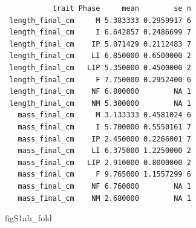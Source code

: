 \documentclass[
  landscape]{article}
\newenvironment{Shaded}{\begin{snugshade}}{\end{snugshade}}
\newcommand{\NormalTok}[1]{#1}
\begin{document}
\begin{verbatim}
           trait Phase     mean        se n
 length_final_cm     M 5.383333 0.2959917 6
 length_final_cm     I 6.642857 0.2486699 7
 length_final_cm    IP 5.071429 0.2112483 7
 length_final_cm    LI 6.850000 0.6500000 2
 length_final_cm   LIP 5.350000 0.4500000 2
 length_final_cm     F 7.750000 0.2952400 6
 length_final_cm    NF 6.800000        NA 1
 length_final_cm    NM 5.300000        NA 1
   mass_final_cm     M 3.133333 0.4581024 6
   mass_final_cm     I 5.700000 0.5550161 7
   mass_final_cm    IP 2.450000 0.2266001 7
   mass_final_cm    LI 6.375000 1.2250000 2
   mass_final_cm   LIP 2.910000 0.8000000 2
   mass_final_cm     F 9.765000 1.1557299 6
   mass_final_cm    NF 6.760000        NA 1
   mass_final_cm    NM 2.680000        NA 1
\end{verbatim}

\begin{Shaded}
\begin{Highlighting}[]
\NormalTok{figS1ab\_fold}
\end{Highlighting}
\end{Shaded}
\end{document}
